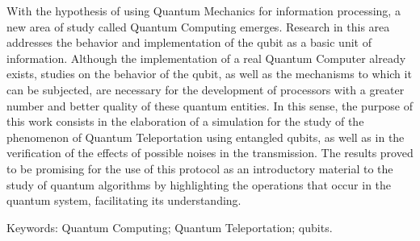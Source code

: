\begin{resumo}[Abstract] %

  With the hypothesis of using Quantum Mechanics for information processing, a new area of ​​study called Quantum Computing emerges. Research in this area addresses the behavior and implementation of the qubit as a basic unit of information. Although the implementation of a real Quantum Computer already exists, studies on the behavior of the qubit, as well as the mechanisms to which it can be subjected, are necessary for the development of processors with a greater number and better quality of these quantum entities. In this sense, the purpose of this work consists in the elaboration of a simulation for the study of the phenomenon of Quantum Teleportation using entangled qubits, as well as in the verification of the effects of possible noises in the transmission. The results proved to be promising for the use of this protocol as an introductory material to the study of quantum algorithms by highlighting the operations that occur in the quantum system, facilitating its understanding.
  \vspace{\onelineskip}

  \noindent
  Keywords: Quantum Computing; Quantum Teleportation; qubits.
\end{resumo}

\cleardoublepage

